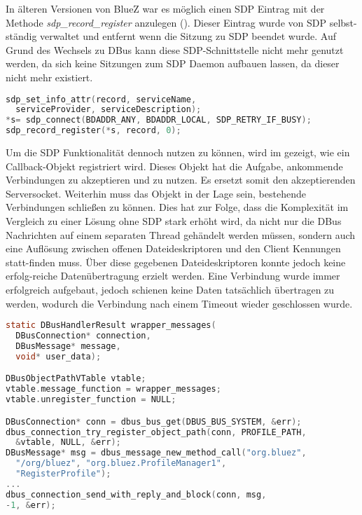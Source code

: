         In älteren Versionen von BlueZ war es möglich einen SDP Eintrag mit der Methode {\it sdp\_record\_register} anzulegen (). Dieser Eintrag wurde von SDP selbst-ständig verwaltet und entfernt wenn die Sitzung zu SDP beendet wurde. Auf Grund des Wechsels zu DBus kann diese SDP-Schnittstelle nicht mehr genutzt werden, da sich keine Sitzungen zum SDP Daemon aufbauen lassen, da dieser nicht mehr existiert.
        
        \begin{lstlisting}[frame=bt, label={lst:bluetooth:sdp}, language=C, caption=Veraltete Nutzung von SDP (Servercode in C)]
sdp_set_info_attr(record, serviceName,
  serviceProvider, serviceDescription);
*s= sdp_connect(BDADDR_ANY, BDADDR_LOCAL, SDP_RETRY_IF_BUSY);
sdp_record_register(*s, record, 0);
        \end{lstlisting}
        
        Um die SDP Funktionalität dennoch nutzen zu können, wird im  gezeigt, wie ein Callback-Objekt registriert wird. Dieses Objekt hat die Aufgabe, ankommende Verbindungen zu akzeptieren und zu nutzen. Es ersetzt somit den akzeptierenden Serversocket. Weiterhin muss das Objekt in der Lage sein, bestehende Verbindungen schließen zu können. Dies hat zur Folge, dass die Komplexität im Vergleich zu einer Lösung ohne SDP stark erhöht wird, da nicht nur die DBus Nachrichten auf einem separaten Thread gehändelt werden müssen, sondern auch eine Auflösung zwischen offenen Dateideskriptoren und den Client Kennungen statt-finden muss.
        Über diese gegebenen Dateideskriptoren konnte jedoch keine erfolg-reiche Datenübertragung erzielt werden. Eine Verbindung wurde immer erfolgreich aufgebaut, jedoch schienen keine Daten tatsächlich übertragen zu werden, wodurch die Verbindung nach einem Timeout wieder geschlossen wurde.
        \pagebreak
    \begin{lstlisting}[frame=bt, label={lst:bluetooth:dbus}, language=C, caption=DBus Nutzung von SDP (Servercode in C)]
static DBusHandlerResult wrapper_messages(
  DBusConnection* connection,
  DBusMessage* message,
  void* user_data);

DBusObjectPathVTable vtable;
vtable.message_function = wrapper_messages;
vtable.unregister_function = NULL;              

DBusConnection* conn = dbus_bus_get(DBUS_BUS_SYSTEM, &err);
dbus_connection_try_register_object_path(conn, PROFILE_PATH,
  &vtable, NULL, &err);
DBusMessage* msg = dbus_message_new_method_call("org.bluez",
  "/org/bluez", "org.bluez.ProfileManager1",
  "RegisterProfile");
...
dbus_connection_send_with_reply_and_block(conn, msg,
-1, &err);
        \end{lstlisting}
        
